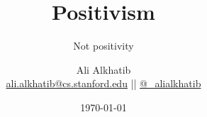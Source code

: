 \documentclass[aspectratio=169,12pt]{beamer} %
\title{Positivism}
\subtitle{Not positivity}
\author{{Ali Alkhatib}\\
\href{mailto:ali.alkhatib@cs.stanford.edu}{ali.alkhatib@cs.stanford.edu} ||
         \href{http://twitter.com/_alialkhatib}{@\_alialkhatib}}
\institute[Stanford]{reading with friends}
\date{\today}
\newcommand{\onlyinsubfile}[1]{#1}
\newcommand{\notinsubfile}[1]{}
\begin{document}
\renewcommand{\onlyinsubfile}[1]{}
\renewcommand{\notinsubfile}[1]{#1}

\begin{frame}
\titlepage
\end{frame}


% 








% 








% 


% 
% 
% 

% 

% 



\end{document}
